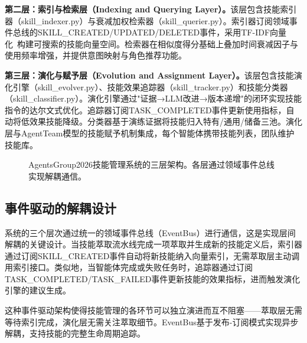 \documentclass[conference]{IEEEtran}
\begin{document}
\textbf{第二层：索引与检索层（Indexing and Querying Layer）。}该层包含技能索引器（skill\_indexer.py）与衰减加权检索器（skill\_querier.py）。索引器订阅领域事件总线的SKILL\_CREATED/UPDATED/DELETED事件，采用TF-IDF向量化~\cite{salton1975vector}构建可搜索的技能向量空间。检索器在相似度得分基础上叠加时间衰减因子与使用频率增强，并提供意图映射与角色推荐功能。

\textbf{第三层：演化与赋予层（Evolution and Assignment Layer）。}该层包含技能演化引擎（skill\_evolver.py）、技能效果追踪器（skill\_tracker.py）和技能分类器（skill\_classifier.py）。演化引擎通过"证据→LLM改进→版本递增"的闭环实现技能指令的达尔文式优化。追踪器订阅TASK\_COMPLETED事件更新使用指标，自动将低效果技能降级。分类器基于演练证据将技能归入特有/通用/储备三池。演化层与AgentTeam模型的技能赋予机制集成，每个智能体携带技能列表，团队维护技能库。

\begin{figure}[h]
\centering
{}
\caption{AgentsGroup2026技能管理系统的三层架构。各层通过领域事件总线实现解耦通信。}
\label{fig:architecture}
\end{figure}

\subsection{事件驱动的解耦设计}

系统的三个层次通过统一的领域事件总线（EventBus）进行通信，这是实现层间解耦的关键设计。当技能萃取流水线完成一项萃取并生成新的技能定义后，索引器通过订阅SKILL\_CREATED事件自动将新技能纳入向量索引，无需萃取层主动调用索引接口。类似地，当智能体完成或失败任务时，追踪器通过订阅TASK\_COMPLETED/TASK\_FAILED事件更新技能的效果指标，进而触发演化引擎的建议生成。

这种事件驱动架构使得技能管理的各环节可以独立演进而互不阻塞——萃取层无需等待索引完成，演化层无需关注萃取细节。EventBus基于发布-订阅模式实现异步解耦，支持技能的完整生命周期追踪。
\end{document}
